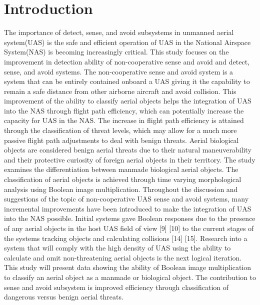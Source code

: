 \section{Introduction}
\indent The importance of detect, sense, and avoid subsystems in unmanned aerial system(UAS) is the safe and efficient operation of UAS in the National Airspace System(NAS) is becoming increasingly critical. This study focuses on the improvement in detection ability of non-cooperative sense and avoid and detect, sense, and avoid systems. The non-cooperative sense and avoid system is a system that can be entirely contained onboard a UAS giving it the capability to remain a safe distance from other airborne aircraft and avoid collision. This improvement of the ability to classify aerial objects helps the integration of UAS into the NAS through flight path efficiency, which can potentially increase the capacity for UAS in the NAS. The increase in flight path efficiency is attained through the classification of threat levels, which may allow for a much more passive flight path adjustments to deal with benign threats. Aerial biological objects are considered benign aerial threats due to their natural maneuverability and their protective curiosity of foreign aerial objects in their territory. The study examines the differentiation between manmade biological aerial objects. The classification of aerial objects is achieved through time varying morphological analysis using Boolean image multiplication. Throughout the discussion and suggestions of the topic of non-cooperative UAS sense and avoid systems, many incremental improvements have been introduced to make the integration of UAS into the NAS possible. Initial systems gave Boolean responses due to the presence of any aerial objects in the host UAS field of view [9] [10] to the current stages of the systems tracking objects and calculating collisions [14] [15]. Research into a system that will comply with the high density of UAS using the ability to calculate and omit non-threatening aerial objects is the next logical iteration.\\
\indent This study will present data showing the ability of Boolean image multiplication to classify an aerial object as a manmade or biological object. The contribution to sense and avoid subsystem is improved efficiency through classification of dangerous versus benign aerial threats.